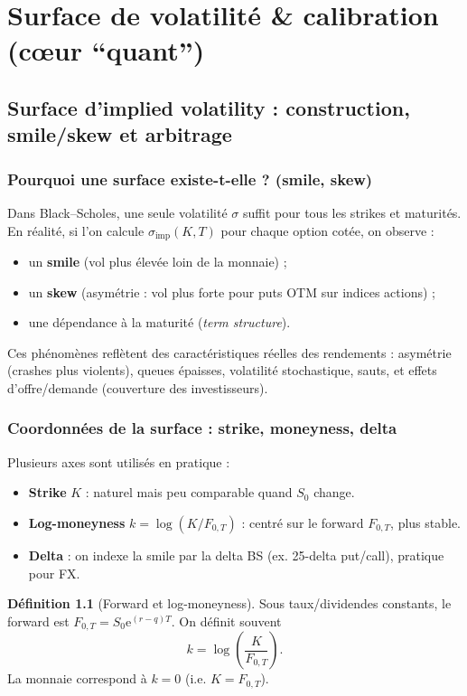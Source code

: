 \documentclass[11pt,a4paper]{report}
\newcommand{\ee}{\mathrm{e}}
\newcommand{\1}{\mathbbm{1}}
\theoremstyle{definition}
\newtheorem{definition}{Définition}[chapter]
\theoremstyle{plain}
\theoremstyle{remark}
\begin{document}
\part{Surface de volatilité \& calibration (cœur ``quant'')}

\chapter{Surface d'implied volatility : construction, smile/skew et arbitrage}
\label{chap:surface_iv}

\section{Pourquoi une surface existe-t-elle ? (smile, skew)}
Dans Black--Scholes, une seule volatilité $\sigma$ suffit pour tous les strikes et maturités.
En réalité, si l'on calcule $\sigma_{\mathrm{imp}}(K,T)$ pour chaque option cotée, on observe :
\begin{itemize}
  \item un \textbf{smile} (vol plus élevée loin de la monnaie) ;
  \item un \textbf{skew} (asymétrie : vol plus forte pour puts OTM sur indices actions) ;
  \item une dépendance à la maturité (\emph{term structure}).
\end{itemize}
Ces phénomènes reflètent des caractéristiques réelles des rendements :
asymétrie (crashes plus violents), queues épaisses, volatilité stochastique, sauts,
et effets d'offre/demande (couverture des investisseurs).

\section{Coordonnées de la surface : strike, moneyness, delta}
\label{sec:moneyness}
Plusieurs axes sont utilisés en pratique :
\begin{itemize}
  \item \textbf{Strike} $K$ : naturel mais peu comparable quand $S_0$ change.
  \item \textbf{Log-moneyness} $k=\log(K/F_{0,T})$ : centré sur le forward $F_{0,T}$, plus stable.
  \item \textbf{Delta} : on indexe la smile par la delta BS (ex. 25-delta put/call), pratique pour FX.
\end{itemize}

\begin{definition}[Forward et log-moneyness]
Sous taux/dividendes constants, le forward est $F_{0,T}=S_0\ee^{(r-q)T}$.
On définit souvent
\[
k = \log\left(\frac{K}{F_{0,T}}\right).
\]
La monnaie correspond à $k=0$ (i.e. $K=F_{0,T}$).
\end{definition}
\end{document}
